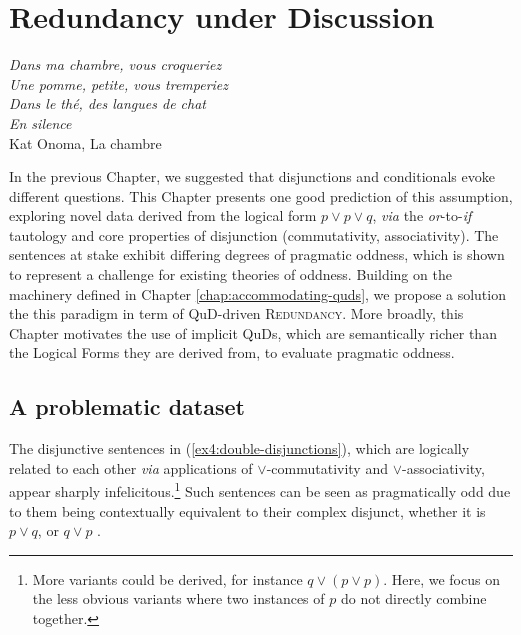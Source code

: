 
\chapter[Redundancy under Discussion]{Redundancy under Discussion\footnotemark}\label{chap:redundancy}


\begin{flushright}
	\textit{Dans ma chambre, vous croqueriez}\\
	\textit{Une pomme, petite, vous tremperiez}\\
	\textit{Dans le thé, des langues de chat}\\
	\textit{En silence}\\\vspace{2mm}
	Kat Onoma, La chambre
\end{flushright}


In the previous Chapter, we suggested that disjunctions and conditionals evoke different questions. This Chapter presents one good prediction of this assumption, exploring novel data derived from the logical form $p\vee p \vee q$, \textit{via} the \textit{or}-to-\textit{if} tautology and core properties of disjunction (commutativity, associativity). The sentences at stake exhibit differing degrees of pragmatic oddness, which is shown to represent a challenge for existing theories of oddness. Building on the machinery defined in Chapter \ref{chap:accommodating-quds}, we propose a solution the this paradigm in term of QuD-driven \textsc{Redundancy}. More broadly, this Chapter motivates the use of implicit QuDs, which are semantically richer than the Logical Forms they are derived from, to evaluate pragmatic oddness.


\section{A problematic dataset}

The disjunctive sentences in (\ref{ex4:double-disjunctions}), which are logically related to each other \textit{via} applications of $\vee$-commutativity and $\vee$-associativity, appear sharply infelicitous.\footnote{More variants could be derived, for instance $q\vee(p\vee p)$. Here, we focus on the less obvious variants where two instances of $p$ do not directly combine together.} Such sentences can be seen as pragmatically odd due to them being contextually equivalent to their complex disjunct, whether it is $p\vee q$, or $q \vee p$ \parencite{Meyer2013,Mayr2016,Katzir2014}.

